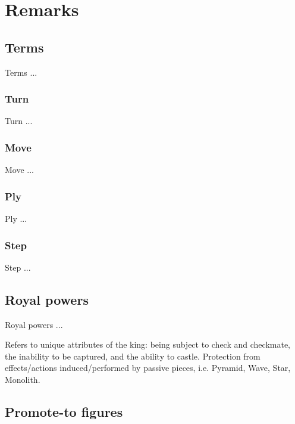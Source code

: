 
\chapter*{Remarks}

\section*{Terms}

Terms ...

\subsection*{Turn}
Turn ...

\subsection*{Move}
Move ...

\subsection*{Ply}
Ply ...

\subsection*{Step}
Step ...

\section*{Royal powers}

Royal powers ...

    Refers to unique attributes of the king: being subject to check and checkmate, the inability to be captured, and the ability to castle.
    Protection from effects/actions induced/performed by passive pieces, i.e. Pyramid, Wave, Star, Monolith.


\section*{Promote-to figures}

